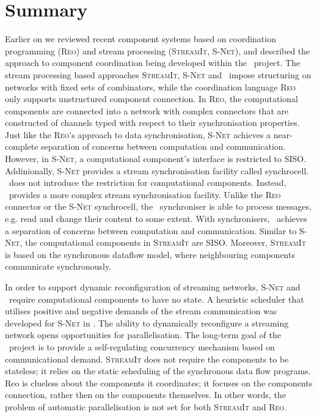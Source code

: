     \section{Summary}
Earlier on we reviewed recent component systems based on coordination programming (\textsc{Reo}) and stream processing (\textsc{StreamIt, S-Net}), and described the approach to component coordination being developed within the \ak\ project. The stream processing based approaches \textsc{StreamIt}, \textsc{S-Net} and \ak\ impose structuring on networks with fixed sets of combinators, while the coordination language \textsc{Reo} only supports unstructured component connection. In \textsc{Reo}, the computational components are connected into a network with complex connectors that are constructed of channels typed with respect to their synchronisation properties. Just like the \textsc{Reo}'s approach to data synchronisation, \textsc{S-Net} achieves a near-complete separation of concerns between computation and communication. However, in \textsc{S-Net}, a computational component's interface is restricted to SISO. Addinionally, \textsc{S-Net} provides a stream synchronisation facility called synchrocell. \ak\ does not introduce the restriction for computational components. Instead, \ak\ provides a more complex stream synchronisation facility. Unlike the \textsc{Reo} connector or the \textsc{S-Net} synchrocell, the \ak\ synchroniser is able to process messages, e.g. read and change their content to some extent. With synchronisers, \ak\ achieves a separation of concerns between computation and communication. Similar to \textsc{S-Net}, the computational components in \textsc{StreamIt} are SISO. Moreover, \textsc{StreamIt} is based on the synchronous dataflow model, where neighbouring components communicate synchronously.

In order to support dynamic reconfiguration of streaming networks, \textsc{S-Net} and \ak\ require computational components to have no state. A heuristic scheduler that utilises positive and negative demands of the stream communication was developed for \textsc{S-Net} in \cite{nga}. The ability to dynamically reconfigure a streaming network opens opportunities for parallelisation. The long-term goal of the \ak\ project is to provide a self-regulating concurrency mechanism based on communicational demand. \textsc{StreamIt} does not require the components to be stateless; it relies on the static scheduling of the synchronous data flow programs. Reo is clueless about the components it coordinates; it focuses on the components connection, rather then on the components themselves. In other words, the problem of automatic parallelisation is not set for both \textsc{StreamIt} and \textsc{Reo}.
%
%
